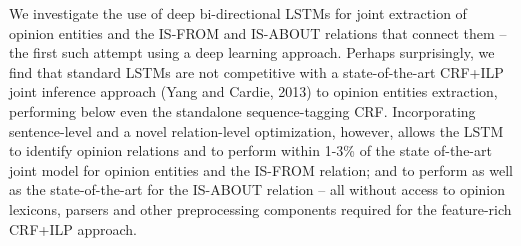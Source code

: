We investigate the use of deep bi-directional LSTMs for joint extraction of opinion entities and the IS-FROM and IS-ABOUT relations that connect them -- the first such attempt using a deep learning approach. Perhaps surprisingly, we find that standard LSTMs are not competitive with a state-of-the-art CRF+ILP joint inference approach (Yang and Cardie, 2013) to opinion entities extraction, performing below even the standalone sequence-tagging CRF. Incorporating sentence-level and a novel relation-level optimization, however, allows the LSTM to identify opinion relations and to perform within 1-3\% of the state of-the-art joint model for opinion entities and the IS-FROM relation; and to perform as well as the state-of-the-art for the IS-ABOUT relation -- all without access to opinion lexicons, parsers and other preprocessing components required for the feature-rich CRF+ILP approach.
